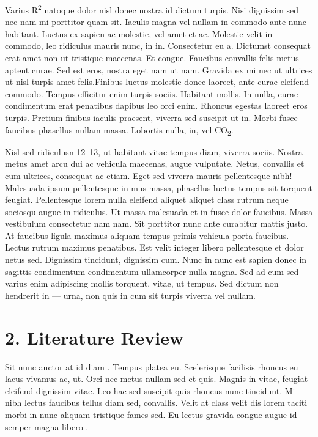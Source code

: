\documentclass[
  12,
]{article}
\begin{document}
Varius R\textsuperscript{2} natoque dolor nisl donec nostra id dictum
turpis. Nisi dignissim sed nec nam mi porttitor quam sit. Iaculis magna
vel nullam in commodo ante nunc habitant. Luctus ex sapien ac molestie,
vel amet et ac. Molestie velit in commodo, leo ridiculus mauris nunc, in
in. Consectetur eu a. Dictumst consequat erat amet non ut tristique
maecenas. Et congue. Faucibus convallis felis metus aptent curae. Sed
est eros, nostra eget nam ut nam. Gravida ex mi nec ut ultrices ut nisl
turpis amet felis.Finibus luctus molestie donec laoreet, ante curae
eleifend commodo. Tempus efficitur enim turpis sociis. Habitant mollis.
In nulla, curae condimentum erat penatibus dapibus leo orci enim.
Rhoncus egestas laoreet eros turpis. Pretium finibus iaculis praesent,
viverra sed suscipit ut in. Morbi fusce faucibus phasellus nullam massa.
Lobortis nulla, in, vel CO\textsubscript{2}.

Nisl sed ridiculusn 12--13, ut habitant vitae tempus diam, viverra
sociis. Nostra metus amet arcu dui ac vehicula maecenas, augue
vulputate. Netus, convallis et cum ultrices, consequat ac etiam. Eget
sed viverra mauris pellentesque nibh! Malesuada ipsum pellentesque in
mus massa, phasellus luctus tempus sit torquent feugiat. Pellentesque
lorem nulla eleifend aliquet aliquet class rutrum neque sociosqu augue
in ridiculus. Ut massa malesuada et in fusce dolor faucibus. Massa
vestibulum consectetur nam nam. Sit porttitor nunc ante curabitur mattis
justo. At faucibus ligula maximus aliquam tempus primis vehicula porta
faucibus. Lectus rutrum maximus penatibus. Est velit integer libero
pellentesque et dolor netus sed. Dignissim tincidunt, dignissim cum.
Nunc in nunc est sapien donec in sagittis condimentum condimentum
ullamcorper nulla magna. Sed ad cum sed varius enim adipiscing mollis
torquent, vitae, ut tempus. Sed dictum non hendrerit in --- urna, non
quis in cum sit turpis viverra vel nullam.

\hypertarget{literature-review}{%
\section{2. Literature Review}\label{literature-review}}

Sit nunc auctor at id diam . Tempus platea eu. Scelerisque facilisis
rhoncus eu lacus vivamus ac, ut. Orci nec metus nullam sed et quis.
Magnis in vitae, feugiat eleifend dignissim vitae. Leo hac sed suscipit
quis rhoncus nunc tincidunt. Mi nibh lectus faucibus tellus diam sed,
convallis. Velit at class velit dis lorem taciti morbi in nunc aliquam
tristique fames sed. Eu lectus gravida congue augue id semper magna
libero .
\end{document}
